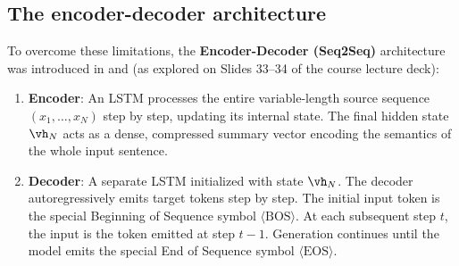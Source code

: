 \documentclass[../../main.tex]{subfiles}
\begin{document}
\subsection{The encoder-decoder architecture}
To overcome these limitations, the \textbf{Encoder-Decoder (Seq2Seq)} architecture was introduced in \cite{sutskever2014} and \cite{cho2014} (as explored on Slides 33--34 of the course lecture deck):
\begin{enumerate}
    \item \textbf{Encoder}: An LSTM processes the entire variable-length source sequence $(x_1, \dots, x_N)$ step by step, updating its internal state. The final hidden state $\vh_N$ acts as a dense, compressed summary vector encoding the semantics of the whole input sentence.
    \item \textbf{Decoder}: A separate LSTM initialized with state $\vh_N$. The decoder autoregressively emits target tokens step by step. The initial input token is the special Beginning of Sequence symbol $\langle\text{BOS}\rangle$. At each subsequent step $t$, the input is the token emitted at step $t-1$. Generation continues until the model emits the special End of Sequence symbol $\langle\text{EOS}\rangle$.
\end{enumerate}
\end{document}
